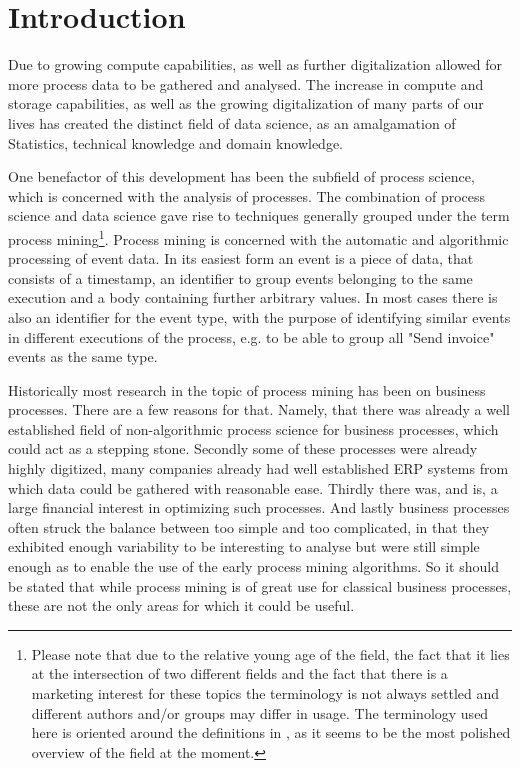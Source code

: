\documentclass[runningheads]{template/llncs}
\begin{document}
\section{Introduction}

Due to growing compute capabilities, as well as further digitalization allowed for more process data to be gathered and analysed.
The increase in compute and storage capabilities, as well as the growing digitalization of many parts of our lives has created the distinct field of data science, as an amalgamation of Statistics, technical knowledge and domain knowledge.

One benefactor of this development has been the subfield of process science, which is concerned with the analysis of processes.
The combination of process science and data science gave rise to techniques generally grouped under the term process mining\footnote{Please note that due to the relative young age of the field, the fact that it lies at the intersection of two different fields and the fact that there is a marketing interest for these topics the terminology is not always settled and different authors and/or groups may differ in usage. The terminology used here is oriented around the definitions in \cite{Aals16}, as it seems to be the most polished overview of the field at the moment.}.
Process mining is concerned with the automatic and algorithmic processing of event data. In its easiest form an event is a piece of data, that consists of a timestamp, an identifier to group events belonging to the same execution and a body containing further arbitrary values.
In most cases there is also an identifier for the event type, with the purpose of identifying similar events in different executions of the process, e.g. to be able to group all "Send invoice" events as the same type.

Historically most research in the topic of process mining has been on business processes. 
There are a few reasons for that. 
Namely, that there was already a well established field of non-algorithmic process science for business processes, which could act as a stepping stone.
Secondly some of these processes were already highly digitized, many companies already had well established ERP systems from which data could be gathered with reasonable ease.
Thirdly there was, and is, a large financial interest in optimizing such processes.
And lastly business processes often struck the balance between too simple and too complicated, in that they exhibited enough variability to be interesting to analyse but were still simple enough as to enable the use of the early process mining algorithms.
So it should be stated that while process mining is of great use for classical business processes, these are not the only areas for which it could be useful.
\end{document}
